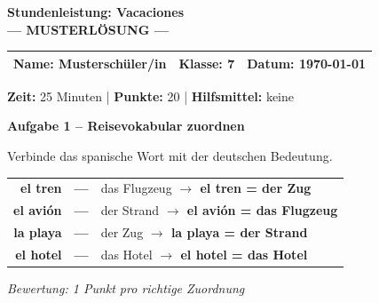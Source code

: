 \documentclass[11pt, a4paper]{article}
\newcommand{\fachfarbe}{spanisch}
\newcommand{\thema}{Stundenleistung: Vacaciones}
\newcommand{\klasse}{7}
\newcommand{\maxpunkte}{20}
\newcommand{\zeit}{25 Minuten}
\newcommand{\datum}{\today}
\newcommand{\punktebox}[1]{\hfill\fbox{\small \_/#1}}
\newcommand{\lsg}[1]{\textcolor{loesung}{\textbf{#1}}}
\newenvironment{aufgabe}[1]{%
    \needspace{5\baselineskip}%
    \nopagebreak[4]%
    \vspace{10pt}
    \noindent\textbf{\textcolor{\fachfarbe}{Aufgabe #1}}
    \nopagebreak[4]%
    \vspace{5pt}
    \nopagebreak[4]%
    \begin{list}{}{\leftmargin=0pt}
    \item[]
}{%
    \end{list}
}
\newcommand{\es}[1]{\textcolor{\fachfarbe}{\textbf{#1}}}
\begin{document}
\begin{center}
    {\Large\bfseries\textcolor{\fachfarbe}{\thema}}\\[0.3em]
    {\large\textcolor{loesung}{\textbf{--- MUSTERLÖSUNG ---}}}
\end{center}

\vspace{5pt}

\noindent
\begin{tabularx}{\textwidth}{|X|X|X|}
\hline
\textbf{Name:} \lsg{Musterschüler/in} &
\textbf{Klasse:} \klasse &
\textbf{Datum:} \datum \\
\hline
\end{tabularx}

\vspace{10pt}

\begin{infobox}
\textbf{Zeit:} \zeit{} | \textbf{Punkte:} \maxpunkte{} | \textbf{Hilfsmittel:} keine
\end{infobox}

\vspace{15pt}


\begin{aufgabe}{1 -- Reisevokabular zuordnen}
Verbinde das spanische Wort mit der deutschen Bedeutung. \punktebox{4}
\end{aufgabe}

\begin{center}
\begin{tabular}{rcl}
\es{el tren} & \lsg{---} & das Flugzeug \lsg{$\rightarrow$ el tren = der Zug} \\[0.8em]
\es{el avión} & \lsg{---} & der Strand \lsg{$\rightarrow$ el avión = das Flugzeug} \\[0.8em]
\es{la playa} & \lsg{---} & der Zug \lsg{$\rightarrow$ la playa = der Strand} \\[0.8em]
\es{el hotel} & \lsg{---} & das Hotel \lsg{$\rightarrow$ el hotel = das Hotel} \\
\end{tabular}
\end{center}

\textit{\textcolor{grau}{Bewertung: 1 Punkt pro richtige Zuordnung}}

\vspace{15pt}

\end{document}
